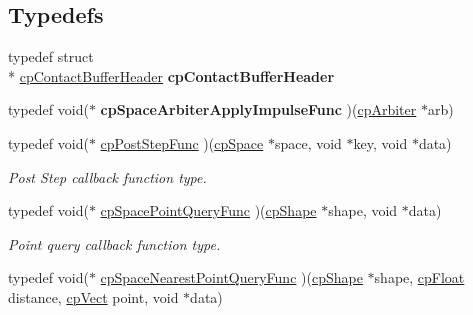 \subsection*{Typedefs}
\begin{DoxyCompactItemize}
\item 
\hypertarget{group__cp_space_ga0dcc2061b696a4f4563b6315d90651cd}{typedef struct \\*
\hyperlink{structcp_contact_buffer_header}{cp\-Contact\-Buffer\-Header} {\bfseries cp\-Contact\-Buffer\-Header}}\label{group__cp_space_ga0dcc2061b696a4f4563b6315d90651cd}

\item 
\hypertarget{group__cp_space_ga5aacd6096c382bf106cf9c3f02ef0b17}{typedef void($\ast$ {\bfseries cp\-Space\-Arbiter\-Apply\-Impulse\-Func} )(\hyperlink{structcp_arbiter}{cp\-Arbiter} $\ast$arb)}\label{group__cp_space_ga5aacd6096c382bf106cf9c3f02ef0b17}

\item 
\hypertarget{group__cp_space_ga54254190b156e3b786c3f256fcc12348}{typedef void($\ast$ \hyperlink{group__cp_space_ga54254190b156e3b786c3f256fcc12348}{cp\-Post\-Step\-Func} )(\hyperlink{structcp_space}{cp\-Space} $\ast$space, void $\ast$key, void $\ast$data)}\label{group__cp_space_ga54254190b156e3b786c3f256fcc12348}

\begin{DoxyCompactList}\small\item\em Post Step callback function type. \end{DoxyCompactList}\item 
\hypertarget{group__cp_space_ga6baa5a302b275b18516294fc3106ca58}{typedef void($\ast$ \hyperlink{group__cp_space_ga6baa5a302b275b18516294fc3106ca58}{cp\-Space\-Point\-Query\-Func} )(\hyperlink{structcp_shape}{cp\-Shape} $\ast$shape, void $\ast$data)}\label{group__cp_space_ga6baa5a302b275b18516294fc3106ca58}

\begin{DoxyCompactList}\small\item\em Point query callback function type. \end{DoxyCompactList}\item 
\hypertarget{group__cp_space_gafcaf86d003ff9bc8ed04569ef07030cf}{typedef void($\ast$ \hyperlink{group__cp_space_gafcaf86d003ff9bc8ed04569ef07030cf}{cp\-Space\-Nearest\-Point\-Query\-Func} )(\hyperlink{structcp_shape}{cp\-Shape} $\ast$shape, \hyperlink{group__basic_types_gac1ed65573e035bf892505768c852d8d3}{cp\-Float} distance, \hyperlink{structcp_vect}{cp\-Vect} point, void $\ast$data)}\label{group__cp_space_gafcaf86d003ff9bc8ed04569ef07030cf}


\end{DoxyCompactItemize}
